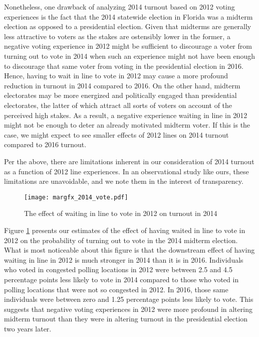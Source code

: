 \documentclass[12pt,titlepage]{article}
\begin{document}
Nonetheless, one drawback of analyzing 2014 turnout based on 2012
voting experiences is the fact that the 2014 statewide election in
Florida was a midterm election as opposed to a presidential election.
Given that midterms are generally less attractive to voters as the
stakes are ostensibly lower in the former, a negative voting
experience in 2012 might be sufficient to discourage a voter from
turning out to vote in 2014 when such an experience might not have
been enough to discourage that same voter from voting in the
presidential election in 2016.  Hence, having to wait in line to vote
in 2012 may cause a more profound reduction in turnout in 2014
compared to 2016.  On the other hand, midterm electorates may be more
energized and politically engaged than presidential electorates, the
latter of which attract all sorts of voters on account of the
perceived high stakes.  As a result, a negative experience waiting in
line in 2012 might not be enough to deter an already motivated midterm
voter.  If this is the case, we might expect to see smaller effects of
2012 lines on 2014 turnout compared to 2016 turnout.

Per the above, there are limitations inherent in our consideration of
2014 turnout as a function of 2012 line experiences.  In an
observational study like ours, these limitations are unavoidable, and
we note them in the interest of transparency.



\begin{figure}[!ht]
  \caption{The effect of waiting in line to vote in 2012 on turnout in 2014}
  \centering\texttt{[image: margfx\_2014\_vote.pdf]}
  \label{fig:prvoting2014}
\end{figure}

Figure \ref{fig:prvoting2014} presents our estimates of the effect of
having waited in line to vote in 2012 on the probability of turning
out to vote in the 2014 midterm election.  What is most noticeable
about this figure is that the downstream effect of having waiting in
line in 2012 is much stronger in 2014 than it is in 2016.  Individuals
who voted in congested polling locations in 2012 were between 2.5 and
4.5 percentage points less likely to vote in 2014 compared to those
who voted in polling locations that were not so congested in 2012.  In
2016, those same individuals were between zero and 1.25 percentage
points less likely to vote.  This suggests that negative voting
experiences in 2012 were more profound in altering midterm turnout
than they were in altering turnout in the presidential election two
years later.
\end{document}
